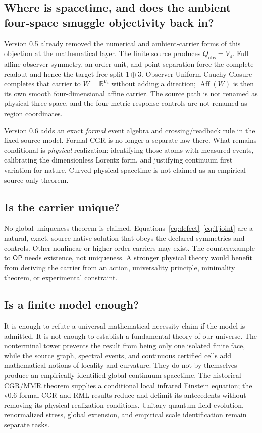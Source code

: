 \documentclass[11pt]{article}
\theoremstyle{definition}
\theoremstyle{remark}
\newcommand{\OPT}{\mathsf{OP}}
\begin{document}
\subsection{Where is spacetime, and does the ambient four-space smuggle objectivity back in?}

Version 0.5 already removed the numerical and ambient-carrier forms of this objection at the mathematical layer. The finite source produces $Q_{\mathrm{obs}}=V_4$. Full affine-observer symmetry, an order unit, and point separation force the complete readout and hence the target-free split $1\oplus3$. Observer Uniform Cauchy Closure completes that carrier to $W=\mathbb R^{V_4}$ without adding a direction; $\operatorname{Aff}(W)$ is then its own smooth four-dimensional affine carrier. The source path is not renamed as physical three-space, and the four metric-response controls are not renamed as region coordinates.

Version 0.6 adds an exact \emph{formal} event algebra and crossing/readback rule in the fixed source model. Formal CGR is no longer a separate law there. What remains conditional is \emph{physical} realization: identifying those atoms with measured events, calibrating the dimensionless Lorentz form, and justifying continuum first variation for nature. Curved physical spacetime is not claimed as an empirical source-only theorem.

\subsection{Is the carrier unique?}

No global uniqueness theorem is claimed. Equations~\eqref{eq:defect}--\eqref{eq:Tjoint} are a natural, exact, source-native solution that obeys the declared symmetries and controls. Other nonlinear or higher-order carriers may exist. The counterexample to $\OPT$ needs existence, not uniqueness. A stronger physical theory would benefit from deriving the carrier from an action, universality principle, minimality theorem, or experimental constraint.

\subsection{Is a finite model enough?}

It is enough to refute a universal mathematical necessity claim if the model is admitted. It is not enough to establish a fundamental theory of our universe. The nonterminal tower prevents the result from being only one isolated finite face, while the source graph, spectral events, and continuous certified cells add mathematical notions of locality and curvature. They do not by themselves produce an empirically identified global continuum spacetime. The historical CGR/MMR theorem supplies a conditional local infrared Einstein equation; the v0.6 formal-CGR and RML results reduce and delimit its antecedents without removing its physical realization conditions. Unitary quantum-field evolution, renormalized stress, global extension, and empirical scale identification remain separate tasks.
\end{document}

